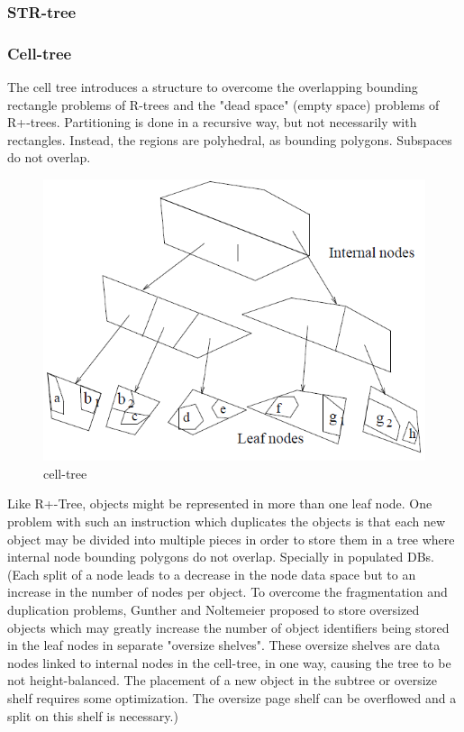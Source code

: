 \documentclass[a4paper,12pt]{article}
\begin{document}
\subsubsection{STR-tree}

\subsubsection{Cell-tree}
The cell tree introduces a structure to overcome the overlapping bounding rectangle problems of R-trees and the "dead space" (empty space) problems of R+-trees. Partitioning is done in a recursive way, but not necessarily with rectangles. Instead, the regions are polyhedral, as bounding polygons. Subspaces do not overlap.  
\begin{figure}
\centering
\includegraphics[width=\textwidth]{celltree}
\caption{cell-tree}
\label{fig1}
\end{figure}

Like R+-Tree, objects might be represented in more than one leaf node. One problem with such an instruction which duplicates the objects is that each new object may be divided into multiple pieces in order to store them in a tree where internal node bounding polygons do not overlap. Specially in populated DBs. 
(Each split of a node leads to a decrease in the node data space but to an increase in the number of nodes per object. To overcome the fragmentation and duplication problems, Gunther and Noltemeier proposed to store oversized objects which may greatly increase the number of object identifiers being stored in the leaf nodes in separate "oversize shelves". These oversize shelves are data nodes linked to internal nodes in the cell-tree, in one way, causing the tree to be not height-balanced. The placement of a new object in the subtree or oversize shelf requires some optimization. The oversize page shelf can be overflowed and a split on this shelf is necessary.)
\end{document}
